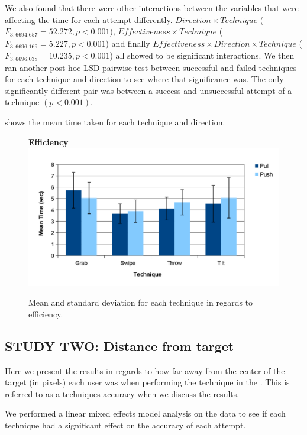 We also found that there were other interactions between the variables that were affecting the time for each attempt differently. 
$Direction \times Technique$  ($F_{3,6694.657} = 52.272, p < 0.001$), $Effectiveness \times Technique$  ($F_{3,6696.169} = 5.227, p < 0.001$) and finally $Effectiveness \times Direction \times Technique$  ($F_{3,6696.038} = 10.235, p < 0.001$) all showed to be significant interactions. 
We then ran another post-hoc LSD pairwise test between successful and failed techniques for each technique and direction to see where that significance was. 
The only significantly different pair was between a success and unsuccessful attempt of a \grab \pull technique $(p < 0.001)$.

 shows the mean time taken for each technique and direction.

\begin{figure}[H]{
	\centering
	\textbf{Efficiency}\\[4pt]
	\includegraphics[width = 1\columnwidth ]{images/time_graph.pdf}} 
	\caption{
		Mean and standard deviation for each technique in regards to efficiency.
	}
	\label{fig:efficiencyGraph}
\end{figure}

\subsection{STUDY TWO: Distance from target}
Here we present the results in regards to how far away from the center of the target (in pixels) each user was when performing the technique in the \accuracy. 
This is referred to as a techniques accuracy when we discuss the results. 

We performed a linear mixed effects model analysis on the data to see if each technique had a significant effect on the accuracy of each attempt. 

